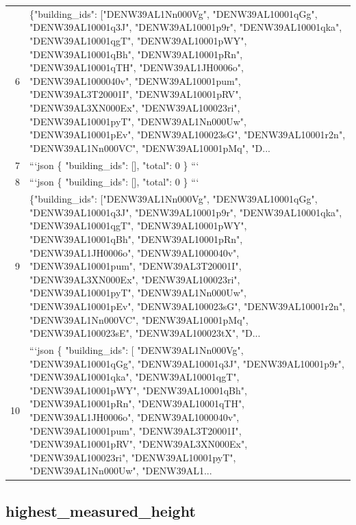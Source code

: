 \documentclass[a4paper,11pt]{article}
\begin{document}
\begin{table}[ht]
\begin{tabular}{r p{12cm}}
6 & \{"building\_ids": ["DENW39AL1Nn000Vg", "DENW39AL10001qGg", "DENW39AL10001q3J", "DENW39AL10001p9r", "DENW39AL10001qka", "DENW39AL10001qgT", "DENW39AL10001pWY", "DENW39AL10001qBh", "DENW39AL10001pRn", "DENW39AL10001qTH", "DENW39AL1JH0006o", "DENW39AL1000040v", "DENW39AL10001pum", "DENW39AL3T20001I", "DENW39AL10001pRV", "DENW39AL3XN000Ex", "DENW39AL100023ri", "DENW39AL10001pyT", "DENW39AL1Nn000Uw", "DENW39AL10001pEv", "DENW39AL100023sG", "DENW39AL10001r2n", "DENW39AL1Nn000VC", "DENW39AL10001pMq", "D... \\
7 & ```json
\{
  "building\_ids": [],
  "total": 0
\}
``` \\
8 & ```json
\{
  "building\_ids": [],
  "total": 0
\}
``` \\
9 & \{"building\_ids": ["DENW39AL1Nn000Vg", "DENW39AL10001qGg", "DENW39AL10001q3J", "DENW39AL10001p9r", "DENW39AL10001qka", "DENW39AL10001qgT", "DENW39AL10001pWY", "DENW39AL10001qBh", "DENW39AL10001pRn", "DENW39AL1JH0006o", "DENW39AL1000040v", "DENW39AL10001pum", "DENW39AL3T20001I", "DENW39AL3XN000Ex", "DENW39AL100023ri", "DENW39AL10001pyT", "DENW39AL1Nn000Uw", "DENW39AL10001pEv", "DENW39AL100023sG", "DENW39AL10001r2n", "DENW39AL1Nn000VC", "DENW39AL10001pMq", "DENW39AL100023sE", "DENW39AL100023tX", "D... \\
10 & ```json
\{
  "building\_ids": [
    "DENW39AL1Nn000Vg",
    "DENW39AL10001qGg",
    "DENW39AL10001q3J",
    "DENW39AL10001p9r",
    "DENW39AL10001qka",
    "DENW39AL10001qgT",
    "DENW39AL10001pWY",
    "DENW39AL10001qBh",
    "DENW39AL10001pRn",
    "DENW39AL10001qTH",
    "DENW39AL1JH0006o",
    "DENW39AL1000040v",
    "DENW39AL10001pum",
    "DENW39AL3T20001I",
    "DENW39AL10001pRV",
    "DENW39AL3XN000Ex",
    "DENW39AL100023ri",
    "DENW39AL10001pyT",
    "DENW39AL1Nn000Uw",
    "DENW39AL1... \\
\hline
\end{tabular}
\end{table}

\clearpage
\subsection{highest\_measured\_height}
\end{document}
